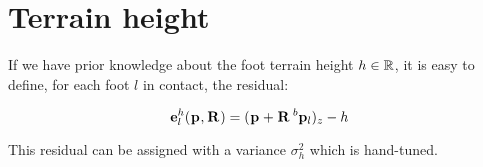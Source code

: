 

\section{Terrain height}
If we have prior knowledge about the foot terrain height $h \in \mathbb{R}$, it is easy to define, for each foot $l$ in contact, the residual:

\begin{equation}
    {\bf e}^h_l(\prescript{}{}{{\bf p}}_{}, \prescript{}{}{{\bf R}}_{}) = (\prescript{}{}{{\bf p}}_{} + \prescript{}{}{{\bf R}}_{} \prescript{b}{}{{\bf p}}_{l})_z - h
\end{equation}

This residual can be assigned with a variance $\sigma_h^2$ which is hand-tuned.

